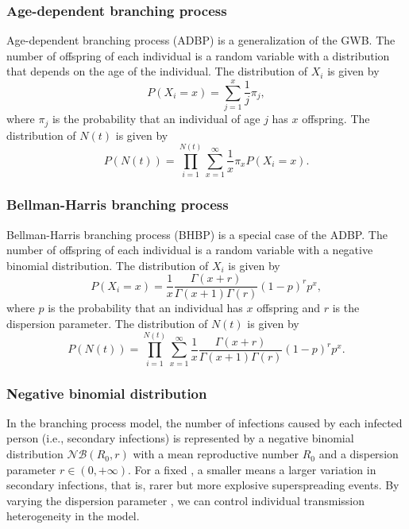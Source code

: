 \documentclass{article}
\begin{document}
\subsubsection*{Age-dependent branching process}
Age-dependent branching process (ADBP) is a generalization of the GWB. The number of offspring of each individual is a random variable with a distribution that depends on the age of the individual. The distribution of $X_i$ is given by
\begin{equation}
P(X_i = x) = \sum_{j=1}^{x} \frac{1}{j} \pi_j,
\end{equation}
where $\pi_j$ is the probability that an individual of age $j$ has $x$ offspring. The distribution of $N(t)$ is given by
\begin{equation}
P(N(t)) = \prod_{i=1}^{N(t)} \sum_{x=1}^{\infty} \frac{1}{x} \pi_x P(X_i = x).
\end{equation}

\subsubsection*{Bellman-Harris branching process}
Bellman-Harris branching process (BHBP) is a special case of the ADBP. The number of offspring of each individual is a random variable with a negative binomial distribution. The distribution of $X_i$ is given by
\begin{equation}
P(X_i = x) = \frac{1}{x} \frac{\Gamma(x+r)}{\Gamma(x+1) \Gamma(r)} (1-p)^r p^x,
\end{equation}
where $p$ is the probability that an individual has $x$ offspring and $r$ is the dispersion parameter. The distribution of $N(t)$ is given by
\begin{equation}
P(N(t)) = \prod_{i=1}^{N(t)} \sum_{x=1}^{\infty} \frac{1}{x} \frac{\Gamma(x+r)}{\Gamma(x+1) \Gamma(r)} (1-p)^r p^x.
\end{equation}

\subsubsection*{Negative binomial distribution}

In the branching process model, the number of infections caused by each infected person (i.e., secondary infections) is represented by a negative binomial distribution $\mathcal{NB}(R_{0}, r)$ with a mean reproductive number $R_{0}$ and a dispersion parameter $r \in (0, +\infty)$. For a fixed , a smaller  means a larger variation in secondary infections, that is, rarer but more explosive superspreading events. By varying the dispersion parameter , we can control individual transmission heterogeneity in the model. 
\end{document}
